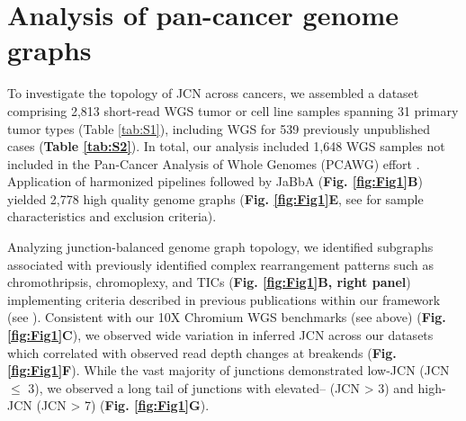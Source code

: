 \documentclass[phd,tocprelim]{cornell}
\renewcommand{\caption}[1]{\singlespacing\hangcaption{#1}\normalspacing}
\begin{document}
\section{Analysis of pan-cancer genome graphs}
To investigate the topology of JCN across cancers, we assembled a dataset comprising 2,813 short-read WGS tumor or cell line samples spanning 31 primary tumor types (Table \ref{tab:S1}), including WGS for 539 previously unpublished cases  (\textbf{Table \ref{tab:S2}}). In total, our analysis included 1,648 WGS samples not included in the Pan-Cancer Analysis of Whole Genomes (PCAWG) effort \cite{pcawg_marker2020-yi}.  Application of harmonized pipelines followed by JaBbA (\textbf{Fig. \ref{fig:Fig1}B}) yielded 2,778 high quality genome graphs (\textbf{Fig. \ref{fig:Fig1}E}, see  for sample characteristics and exclusion criteria). 



Analyzing junction-balanced genome graph topology, we identified subgraphs associated with previously identified complex rearrangement patterns such as chromothripsis, chromoplexy, and TICs (\textbf{Fig. \ref{fig:Fig1}B, right panel}) implementing criteria described in previous publications within our framework (see ). Consistent with our 10X Chromium WGS benchmarks (see above) (\textbf{Fig. \ref{fig:Fig1}C}), we observed wide variation in inferred JCN across our datasets which correlated with observed read depth changes at breakends (\textbf{Fig. \ref{fig:Fig1}F}). While the vast majority of junctions demonstrated low-JCN (JCN $\leq$ 3), we observed a long tail of junctions with elevated– (JCN > 3) and high-JCN (JCN > 7) (\textbf{Fig. \ref{fig:Fig1}G}).
\end{document}
